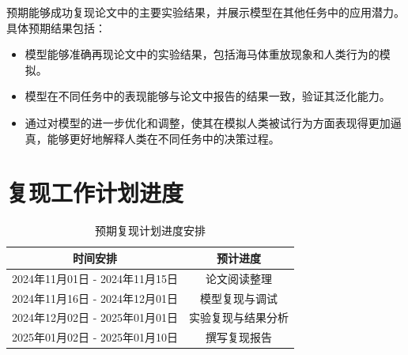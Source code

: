 \documentclass[UTF8,12pt]{article} %
\begin{document}
预期能够成功复现论文中的主要实验结果，并展示模型在其他任务中的应用潜力。具体预期结果包括：

\begin{itemize}
    \item 模型能够准确再现论文中的实验结果，包括海马体重放现象和人类行为的模拟。
    \item 模型在不同任务中的表现能够与论文中报告的结果一致，验证其泛化能力。
    \item 通过对模型的进一步优化和调整，使其在模拟人类被试行为方面表现得更加逼真，能够更好地解释人类在不同任务中的决策过程。

\end{itemize}

\section{复现工作计划进度}

\begin{table}[H]
    \centering
    \begin{tabular}{c|c}
    \hline
    \textbf{时间安排}         & \textbf{预计进度} \\ \hline
    2024年11月01日 - 2024年11月15日 & 论文阅读整理        \\
    2024年11月16日 - 2024年12月01日 & 模型复现与调试      \\
    2024年12月02日 - 2025年01月01日 & 实验复现与结果分析  \\
    2025年01月02日 - 2025年01月10日 & 撰写复现报告        \\ \hline
    \end{tabular}
    \caption{预期复现计划进度安排}
    \label{tab:my_schedule}
\end{table}



\end{document}

